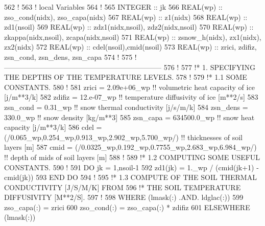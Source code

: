\begin{DoxyCode}
562 \textcolor{comment}{!}
563 \textcolor{comment}{!  local Variables}
564 \textcolor{comment}{!}
565   \textcolor{keywordtype}{INTEGER} :: jk
566   \textcolor{keywordtype}{REAL(wp)} :: zso\_cond(nidx), zso\_capa(nidx)
567   \textcolor{keywordtype}{REAL(wp)} :: z1(nidx)
568   \textcolor{keywordtype}{REAL(wp)} :: zd1(nsoil)
569   \textcolor{keywordtype}{REAL(wp)} :: zdz1(nidx,nsoil),   zdz2(nidx,nsoil)
570   \textcolor{keywordtype}{REAL(wp)} :: zkappa(nidx,nsoil), zcapa(nidx,nsoil)
571   \textcolor{keywordtype}{REAL(wp)} :: zsnow\_h(nidx), zx1(nidx), zx2(nidx)
572   \textcolor{keywordtype}{REAL(wp)} :: cdel(nsoil),cmid(nsoil)
573   \textcolor{keywordtype}{REAL(wp)} :: zrici, zdifiz, zsn\_cond, zsn\_dens, zsn\_capa
574 \textcolor{comment}{!}
575 \textcolor{comment}{!     ------------------------------------------------------------------}
576 \textcolor{comment}{!}
577 \textcolor{comment}{!*    1.  SPECIFYING THE DEPTHS OF THE TEMPERATURE LEVELS.}
578 \textcolor{comment}{!}
579 \textcolor{comment}{!*    1.1 SOME CONSTANTS.}
580 \textcolor{comment}{!}
581   zrici = 2.09e+06\_wp                                 \textcolor{comment}{!! volumetric heat capacity of ice [j/m**3/k]}
582   zdifiz = 12.e-07\_wp                                 \textcolor{comment}{!! temperature diffusivity of ice  [m**2/s]}
583   zsn\_cond = 0.31\_wp                                  \textcolor{comment}{!! snow thermal conductivity [j/s/m/k]}
584   zsn\_dens = 330.0\_wp                                 \textcolor{comment}{!! snow density              [kg/m**3]}
585   zsn\_capa = 634500.0\_wp                              \textcolor{comment}{!! snow  heat capacity   [j/m**3/k]}
586   cdel = (/0.065\_wp,0.254\_wp,0.913\_wp,2.902\_wp,5.700\_wp/)         \textcolor{comment}{!! thicknesses of soil layers [m]}
587   cmid = (/0.0325\_wp,0.192\_wp,0.7755\_wp,2.683\_wp,6.984\_wp/)       \textcolor{comment}{!! depth of mids of soil layers [m]}
588 \textcolor{comment}{!}
589 \textcolor{comment}{!*    1.2 COMPUTING SOME USEFUL CONSTANTS.}
590 \textcolor{comment}{!}
591   \textcolor{keywordflow}{DO} jk = 1,nsoil-1
592      zd1(jk) = 1.\_wp / (cmid(jk+1) - cmid(jk))
593 \textcolor{keywordflow}{  END DO}
594 \textcolor{comment}{!}
595 \textcolor{comment}{!*    1.3 COMPUTE OF THE SOIL THERMAL CONDUCTIVITY [J/S/M/K] FROM}
596 \textcolor{comment}{!*        THE SOIL TEMPERATURE DIFFUSIVITY [M**2/S].}
597 \textcolor{comment}{!}
598   \textcolor{keywordflow}{WHERE} (lmask(:) .AND. ldglac(:))
599     zso\_capa(:) = zrici
600     zso\_cond(:) = zso\_capa(:) * zdifiz
601   \textcolor{keywordflow}{ELSEWHERE} (lmask(:))

\end{DoxyCode}
